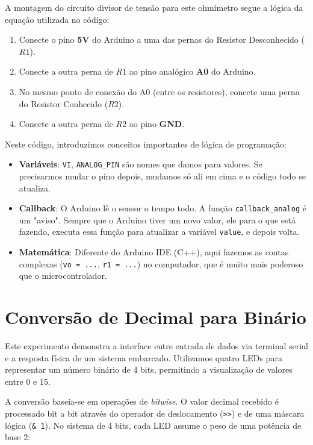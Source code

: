 \documentclass[lang=pt,11pt]{elegantbook}
\begin{document}
A montagem do circuito divisor de tensão para este ohmímetro segue a lógica da equação utilizada no código:
\begin{enumerate}
    \item Conecte o pino \textbf{5V} do Arduino a uma das pernas do Resistor Desconhecido ($R1$).
    \item Conecte a outra perna de $R1$ ao pino analógico \textbf{A0} do Arduino.
    \item No mesmo ponto de conexão do A0 (entre os resistores), conecte uma perna do Resistor Conhecido ($R2$).
    \item Conecte a outra perna de $R2$ ao pino \textbf{GND}.
\end{enumerate}

Neste código, introduzimos conceitos importantes de lógica de programação:

\begin{itemize}
    \item \textbf{Variáveis}: \lstinline{VI}, \lstinline{ANALOG_PIN} são nomes que damos para valores. Se precisarmos mudar o pino depois, mudamos só ali em cima e o código todo se atualiza.
    \item \textbf{Callback}: O Arduino lê o sensor o tempo todo. A função \lstinline{callback_analog} é um "aviso". Sempre que o Arduino tiver um novo valor, ele para o que está fazendo, executa essa função para atualizar a variável \lstinline{value}, e depois volta.
    \item \textbf{Matemática}: Diferente do Arduino IDE (C++), aqui fazemos as contas complexas (\lstinline{vo = ...}, \lstinline{r1 = ...}) no computador, que é muito mais poderoso que o microcontrolador.
\end{itemize}

\section{Conversão de Decimal para Binário}

Este experimento demonstra a interface entre entrada de dados via terminal serial e a resposta física de um sistema embarcado. Utilizamos quatro LEDs para representar um número binário de 4 bits, permitindo a visualização de valores entre 0 e 15.

A conversão baseia-se em operações de \textit{bitwise}. O valor decimal recebido é processado bit a bit através do operador de deslocamento (\lstinline{>>}) e de uma máscara lógica (\lstinline{& 1}). No sistema de 4 bits, cada LED assume o peso de uma potência de base 2:
\end{document}
